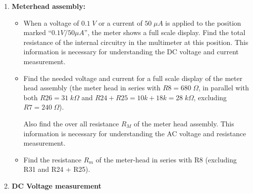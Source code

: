 


\begin{enumerate}
\item {\bf Meterhead assembly:}

  \begin{itemize}

  \item 
    When a voltage of $0.1\;V$ or a current of $50\;\mu A$ is applied to 
    the position marked ``$0.1V/50\mu A$'', the meter shows a full scale display.
    Find the total resistance of the internal circuitry in the multimeter at this
    position. This information is necessary for understanding the DC voltage and
    current measurement.


  \item 
    Find the needed voltage and current for a full scale display of the meter
    head assembly (the meter head in series with $R8=680\;\Omega$, in parallel 
    with both $R26=31\;k\Omega$ and $R24+R25=10k+18k=28\;k\Omega$, excluding
    $R7=240\;\Omega$). 

    Also find the over all resistance $R_M$ of the meter head assembly. This 
    information is necessary for understanding the AC voltage and resistance 
    measurement.

    \begin{comment}
    {\bf Solution:} 

    The meter-head assembly excluding $R7=240$ is $2000-240=1760\;\Omega=1.76\;k\Omega$.

    As a current $I_M=0.05\;mA$ is needed for a full scale display, the 
    corresponding voltage across the meter-head assembly is 
    $V_M=I_M R_M=1.76\times 0.05=0.088\;V$. 
    \end{comment}

  \item 
    Find the resistance $R_m$ of the meter-head in series with R8 (excluding R31 
    and R24 + R25).

    \begin{comment}
    {\bf Solution:}
    \[
    \frac{1}{28}+\frac{1}{31}+\frac{1}{R_m}=\frac{1}{1.76},
    \;\;\;\;\;\;   R_m=2\;k\Omega
    \]
    \end{comment}
  \end{itemize}

\item {\bf DC Voltage measurement}
  

\end{enumerate}
